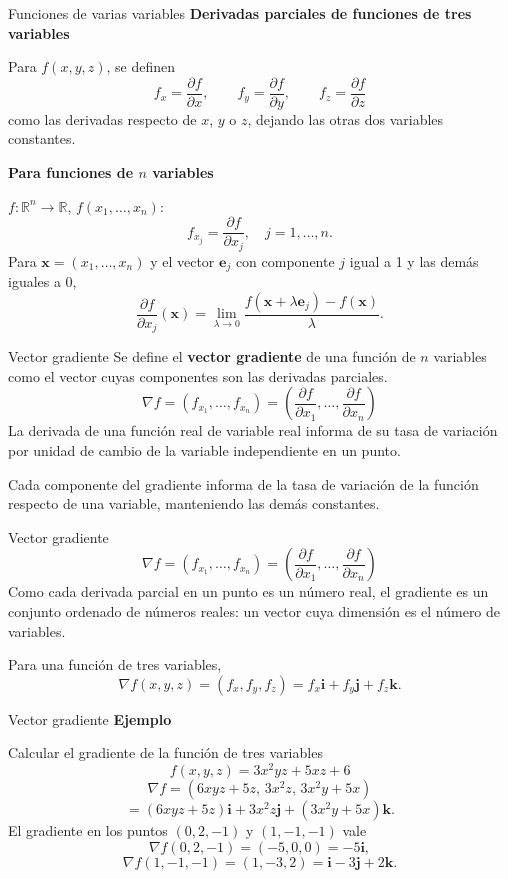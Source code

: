 \documentclass[original_version/main.tex]{subfiles}
\begin{document}
\begin{frame}{Funciones de varias variables}
\small\textbf{Derivadas parciales de funciones de tres variables}\par Para $f(x,y,z)$, se definen
\[f_x=\frac{\partial f}{\partial x},\qquad f_y=\frac{\partial f}{\partial y},\qquad f_z=\frac{\partial f}{\partial z}\]
como las derivadas respecto de $x$, $y$ o $z$, dejando las otras dos variables constantes.
\medskip

\textbf{Para funciones de $n$ variables}\par $f:\mathbb R^n\to\mathbb R$, $f(x_1,\ldots,x_n)$:
\[f_{x_j}=\frac{\partial f}{\partial x_j},\quad j=1,\ldots,n.\]
Para $\mathbf x=(x_1,\ldots,x_n)$ y el vector $\mathbf e_j$ con componente $j$ igual a 1 y las demás iguales a 0,
\[\frac{\partial f}{\partial x_j}(\mathbf x)=\lim_{\lambda\to0}\frac{f(\mathbf x+\lambda\mathbf e_j)-f(\mathbf x)}{\lambda}.\]
\end{frame}
\begin{frame}{Vector gradiente}
\small Se define el \textbf{vector gradiente} de una función de $n$ variables como el vector cuyas componentes son las derivadas parciales.
\[\nabla f=(f_{x_1},\ldots,f_{x_n})=\left(\frac{\partial f}{\partial x_1},\ldots,\frac{\partial f}{\partial x_n}\right)\]
La derivada de una función real de variable real informa de su tasa de variación por unidad de cambio de la variable independiente en un punto.
\medskip

Cada componente del gradiente informa de la tasa de variación de la función respecto de una variable, manteniendo las demás constantes.
\end{frame}
\begin{frame}{Vector gradiente}
\small\[\nabla f=(f_{x_1},\ldots,f_{x_n})=\left(\frac{\partial f}{\partial x_1},\ldots,\frac{\partial f}{\partial x_n}\right)\]
Como cada derivada parcial en un punto es un número real, el gradiente es un conjunto ordenado de números reales: un vector cuya dimensión es el número de variables.
\medskip

Para una función de tres variables,
\[\nabla f(x,y,z)=(f_x,f_y,f_z)=f_x\mathbf i+f_y\mathbf j+f_z\mathbf k.\]
\end{frame}
\begin{frame}{Vector gradiente}
\small\textbf{Ejemplo}\par Calcular el gradiente de la función de tres variables
\[f(x,y,z)=3x^2yz+5xz+6\]
\[\nabla f=(6xyz+5z,\,3x^2z,\,3x^2y+5x)\]
\[=(6xyz+5z)\mathbf i+3x^2z\mathbf j+(3x^2y+5x)\mathbf k.\]
El gradiente en los puntos $(0,2,-1)$ y $(1,-1,-1)$ vale
\[\nabla f(0,2,-1)=(-5,0,0)=-5\mathbf i,\]
\[\nabla f(1,-1,-1)=(1,-3,2)=\mathbf i-3\mathbf j+2\mathbf k.\]
\end{frame}
\end{document}
